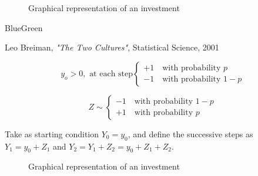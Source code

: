 \documentclass[dvipsnames,12pt]{book}
\begin{document}
            \begin{figure}[h]
                \centering
                \caption{Graphical representation of an investment}
                \label{fig:L4-1}
            \end{figure}

            \begin{mybox}{BlueGreen}{}

                Leo Breiman, \emph{"The Two Cultures"}, Statistical Science, 2001
                
            \end{mybox}

            \begin{equation}
                y_o>0, \text{ at each step} \begin{cases}
                    +1 \quad \text{with probability } p \\
                    -1 \quad \text{with probability } 1-p
                \end{cases}
            \end{equation}

            \[
            Z \sim \begin{cases}
                -1 \quad \text{with probability } 1-p \\
                +1 \quad \text{with probability } p 
            \end{cases}
            \]

            Take as starting condition \( Y_0 = y_0\), and define the successive steps as \(Y_1= y_0 + Z_1\) and \(Y_2 = Y_1 + Z_2 = y_0 + Z_1 +Z_2\).

            \begin{figure}[h]
                \centering
                \caption{Graphical representation of an investment}
                \label{fig:L4-2}
            \end{figure}
\end{document}
